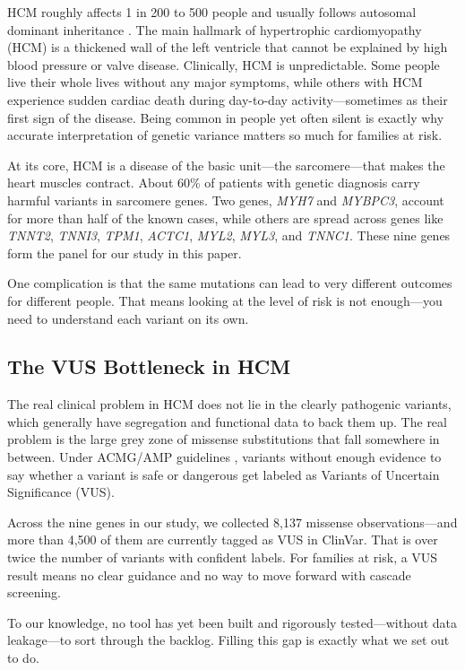 \documentclass[conference]{IEEEtran}
\begin{document}
HCM roughly affects 1 in 200 to 500 people and usually follows autosomal dominant inheritance \cite{maron2013}. The main hallmark of hypertrophic cardiomyopathy (HCM) is a thickened wall of the left ventricle that cannot be explained by high blood pressure or valve disease. Clinically, HCM is unpredictable. Some people live their whole lives without any major symptoms, while others with HCM experience sudden cardiac death during day-to-day activity---sometimes as their first sign of the disease. Being common in people yet often silent is exactly why accurate interpretation of genetic variance matters so much for families at risk.

At its core, HCM is a disease of the basic unit---the sarcomere---that makes the heart muscles contract. About 60\% of patients with genetic diagnosis carry harmful variants in sarcomere genes. Two genes, \textit{MYH7} and \textit{MYBPC3}, account for more than half of the known cases, while others are spread across genes like \textit{TNNT2}, \textit{TNNI3}, \textit{TPM1}, \textit{ACTC1}, \textit{MYL2}, \textit{MYL3}, and \textit{TNNC1}. These nine genes form the panel for our study in this paper.

One complication is that the same mutations can lead to very different outcomes for different people. That means looking at the level of risk is not enough---you need to understand each variant on its own.

\subsection{The VUS Bottleneck in HCM}

The real clinical problem in HCM does not lie in the clearly pathogenic variants, which generally have segregation and functional data to back them up. The real problem is the large grey zone of missense substitutions that fall somewhere in between. Under ACMG/AMP guidelines \cite{richards2015}, variants without enough evidence to say whether a variant is safe or dangerous get labeled as Variants of Uncertain Significance (VUS).

Across the nine genes in our study, we collected 8,137 missense observations---and more than 4,500 of them are currently tagged as VUS in ClinVar. That is over twice the number of variants with confident labels. For families at risk, a VUS result means no clear guidance and no way to move forward with cascade screening.

To our knowledge, no tool has yet been built and rigorously tested---without data leakage---to sort through the backlog. Filling this gap is exactly what we set out to do.
\end{document}
